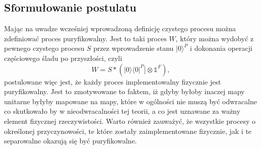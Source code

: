 \documentclass[10pt]{article} %
\newcommand{\Ket}[1]{|#1\rangle}
\newcommand{\Bra}[1]{\langle#1|}
\newcommand{\I}{\mathbb{1}}
\begin{document}
\subsection{Sformułowanie postulatu}
Mając na uwadze wcześniej wprowadzoną definicję czystego procesu można zdefiniować proces puryfikowalny. Jest to taki proces $W$, który można wydobyć
z pewnego czystego procesu $S$ przez wprowadzenie stanu $\Ket{0}^P$ i dokonania operacji częściowego śladu po przyszłości, czyli
\begin{equation}
W = S * \left( \Ket{0}\Bra{0}^P ] \otimes \I^F \right),
\end{equation}
postulowane więc jest, że każdy proces implementowalny fizycznie jest puryfikowalny.
Jest to zmotywowane to faktem, iż gdyby byłoby inaczej 
mapy unitarne byłyby mapowane na mapy, które w ogólności nie muszą być odwracalne co skutkowało by w nieodwracalności tej teorii, a co jest uznawane za ważny element fizycznej rzeczywistości. Warto również zauważyć, że wszystkie procesy o określonej przyczynowości, te które zostały zaimplementowane fizycznie, jak i te separowalne okazują się być puryfikowalne.
\end{document}

